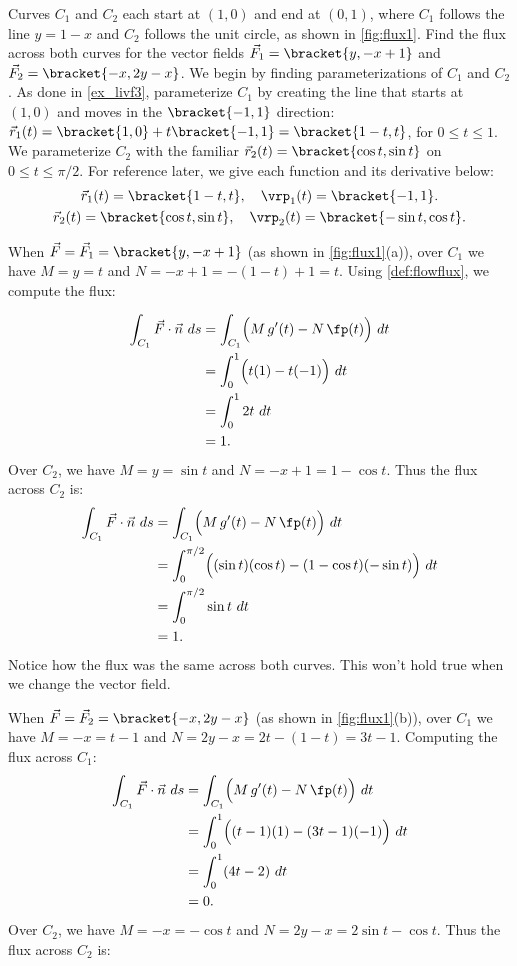 \begin{example}\label{ex_flux1}
Curves $C_1$ and $C_2$ each start at $(1,0)$ and end at $(0,1)$, where $C_1$ follows the line $y=1-x$ and $C_2$ follows the unit circle, as shown in \autoref{fig:flux1}. Find the flux across both curves for the vector fields $\vec F_1 =\bracket{y,-x+1}$ and $\vec F_2 =\bracket{-x,2y-x}$.
\solution
We begin by finding parameterizations of $C_1$ and $C_2$. As done in \autoref{ex_livf3}, parameterize $C_1$ by creating the line that starts at $(1,0)$ and moves in the $\bracket{-1,1}$ direction: $\vec r_1(t) =\bracket{1,0}+t\bracket{-1,1}=\bracket{1-t,t}$, for $0\leq t\leq 1$. We parameterize $C_2$ with the familiar $\vec r_2(t) =\bracket{\cos t,\sin t}$ on $0\leq t\leq \pi/2$. For reference later, we give each function and its derivative below:
\begin{gather*}
\vec r_1(t) =\bracket{1-t,t},\quad\vrp_1(t)=\bracket{-1,1}.\\
\vec r_2(t) =\bracket{\cos t,\sin t}, \quad \vrp_2(t) =\bracket{-\sin t,\cos t}.
\end{gather*}

When $\vec F = \vec F_1 =\bracket{y,-x+1}$ (as shown in \autoref{fig:flux1}(a)), over $C_1$ we have $M = y =t$ and $N = -x+1 = -(1-t)+1 = t$. Using \autoref{def:flowflux}, we compute the flux:

\begin{align*}
\int_{C_1} \vec F\cdot \vec n\ ds & = \int_{C_1} \Bigl(M\,g'(t) - N\,\fp(t)\Bigr)\ dt\\
			&= \int_0^1 \Bigl( t(1) - t(-1)\Bigr)\ dt \\
			&= \int_0^1 2t\ dt\\
			&= 1.
\end{align*}
Over $C_2$, we have $M = y = \sin t$ and $N = -x+1 = 1-\cos t$. Thus the flux across $C_2$ is:
\begin{align*}
	\int_{C_1} \vec F\cdot \vec n\ ds
	& = \int_{C_1} \Bigl(M\,g'(t) - N\,\fp(t)\Bigr)\ dt\\
	&= \int_0^{\pi/2}\Bigl((\sin t)(\cos t) - (1-\cos t)(-\sin t)\Bigr)\ dt\\
	&= \int_0^{\pi/2} \sin t\ dt\\
	&=1.
\end{align*}
Notice how the flux was the same across both curves. This won't hold true when we change the vector field.

When $\vec F=\vec F_2=\bracket{-x,2y-x}$ (as shown in \autoref{fig:flux1}(b)), over $C_1$ we have $M=-x=t-1$ and $N=2y-x=2t-(1-t)=3t-1$. Computing the flux across $C_1$:
\begin{align*}
	\int_{C_1} \vec F\cdot \vec n\ ds
	& = \int_{C_1} \Bigl(M\,g'(t) - N\,\fp(t)\Bigr)\ dt\\
	&= \int_0^1 \Bigl( (t-1)(1) - (3t-1)(-1)\Bigr)\ dt \\
	&= \int_0^1 (4t-2)\ dt\\
	&= 0.
\end{align*}
Over $C_2$, we have $M = -x = -\cos t$ and $N = 2y-x = 2\sin t-\cos t$. Thus the flux across $C_2$ is:


\end{example}
